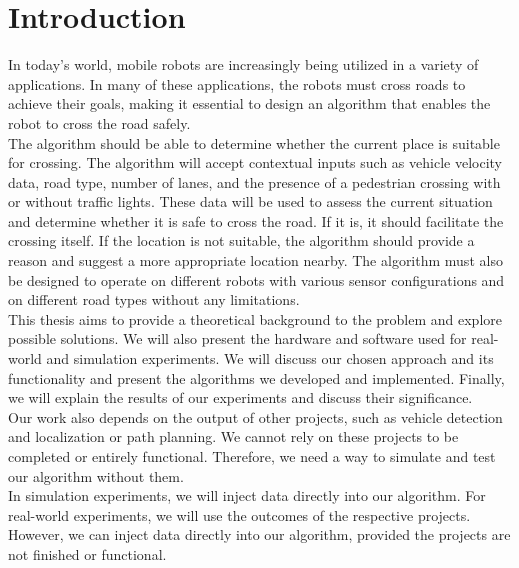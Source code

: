 \chapter*{Introduction}
    In today's world, mobile robots are increasingly being utilized in a variety of applications. In many of these applications, the robots must cross roads to achieve their goals, making it essential to design an algorithm that enables the robot to cross the road safely.\\
    The algorithm should be able to determine whether the current place is suitable for crossing. The algorithm will accept contextual inputs such as vehicle velocity data, road type, number of lanes, and the presence of a pedestrian crossing with or without traffic lights. These data will be used to assess the current situation and determine whether it is safe to cross the road. If it is, it should facilitate the crossing itself. If the location is not suitable, the algorithm should provide a reason and suggest a more appropriate location nearby. The algorithm must also be designed to operate on different robots with various sensor configurations and on different road types without any limitations.\\
    This thesis aims to provide a theoretical background to the problem and explore possible solutions. We will also present the hardware and software used for real-world and simulation experiments. We will discuss our chosen approach and its functionality and present the algorithms we developed and implemented. Finally, we will explain the results of our experiments and discuss their significance.\\
    Our work also depends on the output of other projects, such as vehicle detection and localization or path planning. We cannot rely on these projects to be completed or entirely functional. Therefore, we need a way to simulate and test our algorithm without them.\\
    In simulation experiments, we will inject data directly into our algorithm. For real-world experiments, we will use the outcomes of the respective projects. However, we can inject data directly into our algorithm, provided the projects are not finished or functional.
